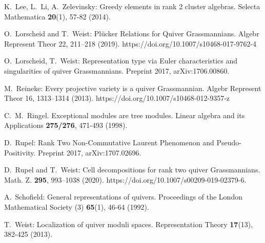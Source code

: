 \documentclass{amsart}
\numberwithin{equation}{section}
\begin{document}
\begin{thebibliography}{10}
  K.~Lee, L.~Li, A.~Zelevinsky: Greedy elements in rank 2 cluster algebras. Selecta Mathematica \textbf{20}(1), 57-82 (2014).

  O.~Lorscheid and T.~Weist: Plücker Relations for Quiver Grassmannians. Algebr Represent Theor 22, 211–218 (2019). https://doi.org/10.1007/s10468-017-9762-4

  O.~Lorscheid, T.~Weist: Representation type via Euler characteristics and singularities of quiver Grassmannians. Preprint 2017, arXiv:1706.00860.

  M.~Reineke: Every projective variety is a quiver Grassmannian. Algebr Represent Theor 16, 1313–1314 (2013). https://doi.org/10.1007/s10468-012-9357-z

  C.~M.~Ringel. Exceptional modules are tree modules. Linear algebra and its Applications \textbf{275/276}, 471-493 (1998).

  D.~Rupel: Rank Two Non-Commutative Laurent Phenomenon and Pseudo-Positivity. Preprint 2017, arXiv:1707.02696.

  D.~Rupel and T.~Weist: Cell decompositions for rank two quiver Grassmannians.  Math. Z. \textbf{295}, 993–1038 (2020). https://doi.org/10.1007/s00209-019-02379-6.

  A.~Schofield: General representations of quivers. Proceedings of the London Mathematical Society (3) \textbf{65}(1), 46-64 (1992).

  T.~Weist: Localization of quiver moduli spaces. Representation Theory \textbf{17}(13), 382-425 (2013).

\end{thebibliography}
  
\end{document}
